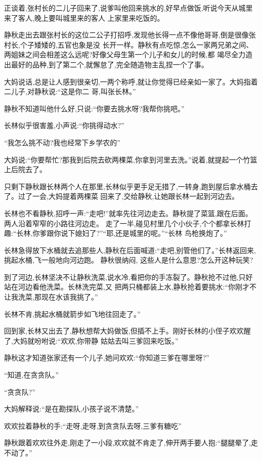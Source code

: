 ﻿\documentclass[12pt]{article}
\begin{document}
正谈着,张村长的二儿子回来了,说爹叫他回来挑水的,好早点做饭,听说今天从城里来了客人,晚上要叫城里来的客人
上家里来吃饭的。

静秋走出去跟张村长的这位二公子打招呼,发现他长得一点不像他哥哥,倒是很像张村长,个子矮矮的,五官也象是没
长开一样。静秋有点吃惊,怎么一家两兄弟之间、两姐妹之间会相差这么远呢?好像父母生第一个儿子和女儿的时候,都
竭尽全力造出最好的品种,到了第二个,就懈怠了,完全随造物主乱捏一个了事。

大妈说话,总是让人感到很亲切,一两个称呼,就让你觉得已经亲如一家了。大妈指着二儿子,对静秋说:``这是你二
哥,叫张长林。''

静秋不知道叫他什么好,只说:``你要去挑水呀?我帮你挑吧。''

长林似乎很害羞,小声说:``你挑得动水?''

``我怎么挑不动?我也经常下乡学农的\myrule ''

大妈说:``你要帮忙?那我到后院去砍两棵菜,你拿到河里去洗。''说着,就提起一个竹篮上后院去了。

只剩下静秋跟长林两个人在那里,长林似乎更手足无措了,一转身,跑到屋后拿水桶去了。过了一会,大妈提着两棵菜
回来了,交给静秋,让她跟长林一起到河边去。

长林也不看静秋,招呼一声:``走吧!''就率先往河边走去。静秋提了菜篮,跟在后面。两人沿着窄窄的小路往河边走。
走了一半,碰见村里几个小伙子,个个都拿长林打趣:``长林,你爹跟你说下媳妇了?''``耶,还是城里的呢。''``长林
鸟枪换炮了。''

长林急得放下水桶就去追那些人,静秋在后面喊道:``走吧,别管他们了。''长林返回来,挑起水桶,飞一般地向河边跑。
静秋很纳闷, 这些人是什么意思?怎么开这种玩笑?

到了河边,长林坚决不让静秋洗菜,说水冷,看把你的手冻裂了。静秋抢不过他,只好站在河边看他洗菜。长林洗完菜,又
把两只桶都装上水,静秋抢着要挑水:``你刚才不让我洗菜,那现在水该我挑了。''

长林不肯,挑起水桶就箭步如飞地往回走了。''

回到家,长林又出去了,静秋想帮大妈做饭,但插不上手。刚好长林的小侄子欢欢醒了,大妈就吩咐说:``欢欢,你带静
姑姑去叫三爹回来吃饭。''

静秋这才知道张家还有一个儿子,她问欢欢:``你知道三爹在哪里呀?''

``知道,在贪贪队。''

``贪贪队?''

大妈解释说:``是在勘探队,小孩子说不清楚。''

欢欢拉着静秋的手:``走呀,走呀,到贪贪队去呀,三爹有糖吃\myrule ''

静秋跟着欢欢往外走,刚走了一小段,欢欢就不肯走了,伸开两手要人抱:``腿腿晕了,走不动了。''
\end{document}
